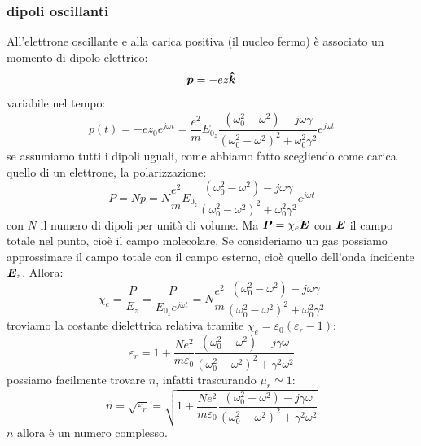 \subsubsection{dipoli oscillanti}
All'elettrone oscillante e alla carica positiva (il nucleo fermo) è associato un momento di dipolo elettrico:
\begin{equation}
  \boldsymbol{p}=-ez\boldsymbol{\hat {k}}
\end{equation}
variabile nel tempo:
\begin{equation}
  p(t)=-ez_0e^{j\omega t}=\frac{e^2}{m}E_{0_z}\frac{(\omega_0^2-\omega^2)-j\omega\gamma}{(\omega_0^2-\omega^2)^2+\omega_0^2\gamma^2}e^{j\omega t}
\end{equation}
se assumiamo tutti i dipoli uguali, come abbiamo fatto scegliendo come carica quello di un elettrone, la polarizzazione:
\begin{equation}
  P=Np=N\frac{e^2}{m}E_{0_z}\frac{(\omega_0^2-\omega^2)-j\omega\gamma}{(\omega_0^2-\omega^2)^2+\omega_0^2\gamma^2}e^{j\omega t}
\end{equation}
con $N$ il numero di dipoli per unità di volume. Ma $\boldsymbol{P}=\chi_e \boldsymbol{E}$ con $\boldsymbol{E}$ il campo totale nel punto, cioè il campo molecolare. Se consideriamo un gas possiamo approssimare il campo totale con il campo esterno, cioè quello dell'onda incidente $\boldsymbol{E}_z$. Allora:
\begin{equation}
  \chi_e=\frac{P}{E_z}=\frac{P}{E_{0_z}e^{j\omega t}}=N\frac{e^2}{m}\frac{(\omega_0^2-\omega^2)-j\omega\gamma}{(\omega_0^2-\omega^2)^2+\omega_0^2\gamma^2}
\end{equation}
troviamo la costante dielettrica relativa tramite $\chi_e=\varepsilon_0(\varepsilon_r-1)$:
\begin{equation}
  \varepsilon_r=1+\frac{Ne^2}{m\varepsilon_0}\frac{(\omega_0^2-\omega^2)-j\gamma\omega}{(\omega_0^2-\omega^2)^2+\gamma^2\omega^2}
\end{equation}
possiamo facilmente trovare $n$, infatti trascurando $\mu_r\simeq 1$:
\begin{equation}
  n=\sqrt{\varepsilon_r}=\sqrt{1+\frac{Ne^2}{m\varepsilon_0}\frac{(\omega_0^2-\omega^2)-j\gamma\omega}{(\omega_0^2-\omega^2)^2+\gamma^2\omega^2}}
  \label{ndisp}
\end{equation}
$n$ allora è un numero complesso.
